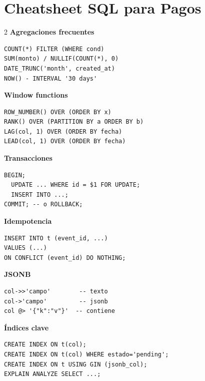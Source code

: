 \documentclass[11pt,a4paper]{article}
\begin{document}
\section{Cheatsheet SQL para Pagos}

\begin{multicols}{2}
\textbf{\textcolor{pgblue}{Agregaciones frecuentes}}
\begin{lstlisting}[style=sql,numbers=none]
COUNT(*) FILTER (WHERE cond)
SUM(monto) / NULLIF(COUNT(*), 0)
DATE_TRUNC('month', created_at)
NOW() - INTERVAL '30 days'
\end{lstlisting}

\textbf{\textcolor{pgblue}{Window functions}}
\begin{lstlisting}[style=sql,numbers=none]
ROW_NUMBER() OVER (ORDER BY x)
RANK() OVER (PARTITION BY a ORDER BY b)
LAG(col, 1) OVER (ORDER BY fecha)
LEAD(col, 1) OVER (ORDER BY fecha)
\end{lstlisting}

\textbf{\textcolor{pgblue}{Transacciones}}
\begin{lstlisting}[style=sql,numbers=none]
BEGIN;
  UPDATE ... WHERE id = $1 FOR UPDATE;
  INSERT INTO ...;
COMMIT; -- o ROLLBACK;
\end{lstlisting}

\columnbreak

\textbf{\textcolor{pgblue}{Idempotencia}}
\begin{lstlisting}[style=sql,numbers=none]
INSERT INTO t (event_id, ...)
VALUES (...)
ON CONFLICT (event_id) DO NOTHING;
\end{lstlisting}

\textbf{\textcolor{pgblue}{JSONB}}
\begin{lstlisting}[style=sql,numbers=none]
col->>'campo'        -- texto
col->'campo'         -- jsonb
col @> '{"k":"v"}'  -- contiene
\end{lstlisting}

\textbf{\textcolor{pgblue}{Índices clave}}
\begin{lstlisting}[style=sql,numbers=none]
CREATE INDEX ON t(col);
CREATE INDEX ON t(col) WHERE estado='pending';
CREATE INDEX ON t USING GIN (jsonb_col);
EXPLAIN ANALYZE SELECT ...;
\end{lstlisting}
\end{multicols}
\end{document}
